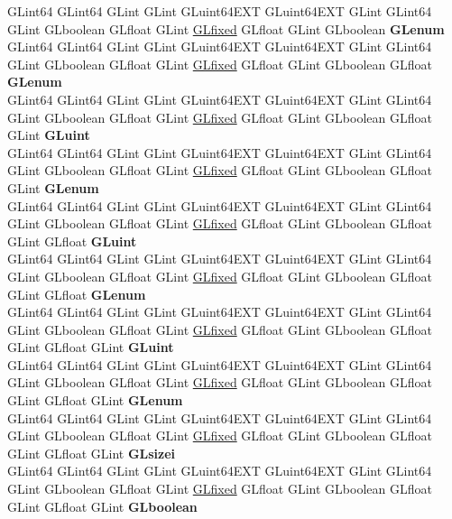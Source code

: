 \begin{DoxyCompactItemize}
\begin{tabbing}
\>GLint64 GLint64 GLint GLint GLuint64EXT GLuint64EXT GLint GLint64 GLint GLboolean GLfloat GLint \hyperlink{glheader_8h_ad6d3fa892df40dedf48ee6d84529ae5e}{GLfixed} GLfloat GLint GLboolean {\bfseries GLenum}\\
\>GLint64 GLint64 GLint GLint GLuint64EXT GLuint64EXT GLint GLint64 GLint GLboolean GLfloat GLint \hyperlink{glheader_8h_ad6d3fa892df40dedf48ee6d84529ae5e}{GLfixed} GLfloat GLint GLboolean GLfloat {\bfseries GLenum}\\
\>GLint64 GLint64 GLint GLint GLuint64EXT GLuint64EXT GLint GLint64 GLint GLboolean GLfloat GLint \hyperlink{glheader_8h_ad6d3fa892df40dedf48ee6d84529ae5e}{GLfixed} GLfloat GLint GLboolean GLfloat GLint {\bfseries GLuint}\\
\>GLint64 GLint64 GLint GLint GLuint64EXT GLuint64EXT GLint GLint64 GLint GLboolean GLfloat GLint \hyperlink{glheader_8h_ad6d3fa892df40dedf48ee6d84529ae5e}{GLfixed} GLfloat GLint GLboolean GLfloat GLint {\bfseries GLenum}\\
\>GLint64 GLint64 GLint GLint GLuint64EXT GLuint64EXT GLint GLint64 GLint GLboolean GLfloat GLint \hyperlink{glheader_8h_ad6d3fa892df40dedf48ee6d84529ae5e}{GLfixed} GLfloat GLint GLboolean GLfloat GLint GLfloat {\bfseries GLuint}\\
\>GLint64 GLint64 GLint GLint GLuint64EXT GLuint64EXT GLint GLint64 GLint GLboolean GLfloat GLint \hyperlink{glheader_8h_ad6d3fa892df40dedf48ee6d84529ae5e}{GLfixed} GLfloat GLint GLboolean GLfloat GLint GLfloat {\bfseries GLenum}\\
\>GLint64 GLint64 GLint GLint GLuint64EXT GLuint64EXT GLint GLint64 GLint GLboolean GLfloat GLint \hyperlink{glheader_8h_ad6d3fa892df40dedf48ee6d84529ae5e}{GLfixed} GLfloat GLint GLboolean GLfloat GLint GLfloat GLint {\bfseries GLuint}\\
\>GLint64 GLint64 GLint GLint GLuint64EXT GLuint64EXT GLint GLint64 GLint GLboolean GLfloat GLint \hyperlink{glheader_8h_ad6d3fa892df40dedf48ee6d84529ae5e}{GLfixed} GLfloat GLint GLboolean GLfloat GLint GLfloat GLint {\bfseries GLenum}\\
\>GLint64 GLint64 GLint GLint GLuint64EXT GLuint64EXT GLint GLint64 GLint GLboolean GLfloat GLint \hyperlink{glheader_8h_ad6d3fa892df40dedf48ee6d84529ae5e}{GLfixed} GLfloat GLint GLboolean GLfloat GLint GLfloat GLint {\bfseries GLsizei}\\
\>GLint64 GLint64 GLint GLint GLuint64EXT GLuint64EXT GLint GLint64 GLint GLboolean GLfloat GLint \hyperlink{glheader_8h_ad6d3fa892df40dedf48ee6d84529ae5e}{GLfixed} GLfloat GLint GLboolean GLfloat GLint GLfloat GLint {\bfseries GLboolean}\\

\end{tabbing}
\end{DoxyCompactItemize}
